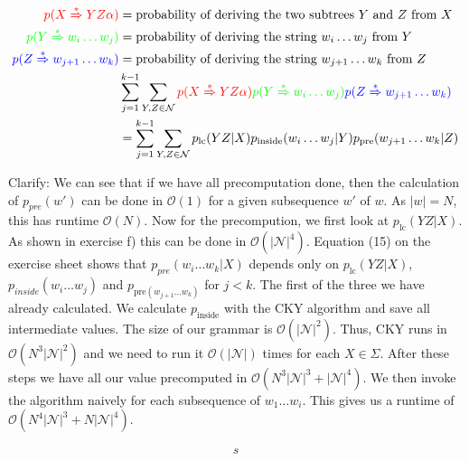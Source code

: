 \documentclass[a4paper,12pt]{ETHexercise}
\begin{document}
\begin{question}
\begin{subquestion}
\begin{align}
			{\color{red}p(X \overset{*}{\Rightarrow} YZ\alpha)}           & = \text{probability of deriving the two subtrees $Y$ and $Z$ from $X$} \label{eq:pre2}                                                                                                                                                    \\
			{\color{green}p(Y \overset{*}{\Rightarrow} w_i \dots w_j)}    & = \text{probability of deriving the string $w_i \dots w_j$ from $Y$} \label{eq:pre3}                                                                                                                                                      \\
			{\color{blue}p(Z \overset{*}{\Rightarrow} w_{j+1} \dots w_k)} & = \text{probability of deriving the string $w_{j+1} \dots w_k$ from $Z$} \label{eq:pre4}                                                                                                                                                  \\
			                                                              & \sum_{j=1}^{k-1} \sum_{Y,Z \in \mathcal{N}} {\color{red} p(X \overset{*}{\Rightarrow} YZ\alpha)}{\color{green}p(Y \overset{*}{\Rightarrow} w_i \dots w_j)}{\color{blue} p(Z \overset{*}{\Rightarrow} w_{j+1} \dots w_k)}                  \\& =\sum_{j=1}^{k-1} \sum_{Y,Z \in \mathcal{N}}p_{\text{lc}}(YZ | X) p_{\text{inside}}(w_i \dots w_j | Y) p_{\text{pre}}(w_{j+1} \dots w_k | Z) \label{eq:pre5}                                                                               \\
		\end{align}
	\end{subquestion}
	\begin{subquestion}
		Clarify:
		We can see that if we have all precomputation done, then the calculation of $p_{pre}(w')$ can be done in $\mathcal{O}(1)$ for a given subsequence $w'$ of $w$. As $|w| = N$, this has runtime $\mathcal{O}(N)$.
		Now for the precompution, we first look at $p_{\text{lc}}(YZ | X)$. As shown in exercise f) this can be done in $\mathcal{O}(|\mathcal{N}|^4)$.
		Equation (15) on the exercise sheet shows that $p_{pre}(w_i \dots w_k | X)$ depends only on $p_{\text{lc}}(YZ | X)$, $p_{inside}(w_i \dots w_j)$ and $p_{\text{pre}(w_{j+1} \dots w_k)}$ for $j < k$. The first of the three we have already calculated. We calculate $p_{\text{inside}}$ with the CKY algorithm and save all intermediate values. The size of our grammar is $\mathcal{O}(|\mathcal{N}|^2)$. Thus, CKY runs in $\mathcal{O}(N^3 |\mathcal{N}|^2)$ and we need to run it $\mathcal{O}(|\mathcal{N}|)$ times for each $X \in \Sigma$.
		\newline
		After these steps we have all our value precomputed in $\mathcal{O}(N^3 |\mathcal{N}|^3 + |\mathcal{N}|^4)$.
		We then invoke the algorithm naively for each subsequence of $w_1 \dots w_i$. This gives us a runtime of $\mathcal{O}(N^4 |\mathcal{N}|^3 + N|\mathcal{N}|^4)$.
	\end{subquestion}
	\begin{align}
		s
	\end{align}
\end{question}
\end{document}
